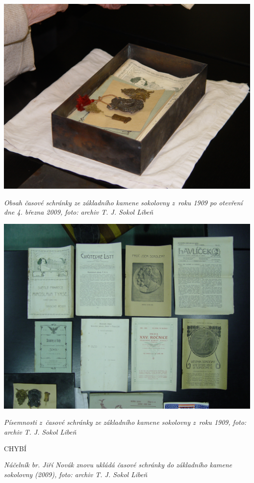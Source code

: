 \documentclass[a5paper, 11pt, twoside]{article}
\begin{document}
 \includegraphics[width=\textwidth]{img/58_schranka.JPG}

\textit{Obsah časové schránky ze základního kamene sokolovny z~roku 1909
po otevření dne 4. března 2009, foto: archiv T. J. Sokol Libeň}


 \includegraphics[width=\textwidth]{img/59_schranka_2.jpg}

\textit{Písemnosti z~časové schránky ze základního kamene sokolovny z~roku
1909, foto: archiv T. J. Sokol Libeň}

{\Huge \color{sokolred} CHYBÍ}

\textit{Náčelník br. Jiří Novák znovu ukládá časové schránky do základního
kamene sokolovny (2009), foto: archiv T. J. Sokol Libeň}
\end{document}
